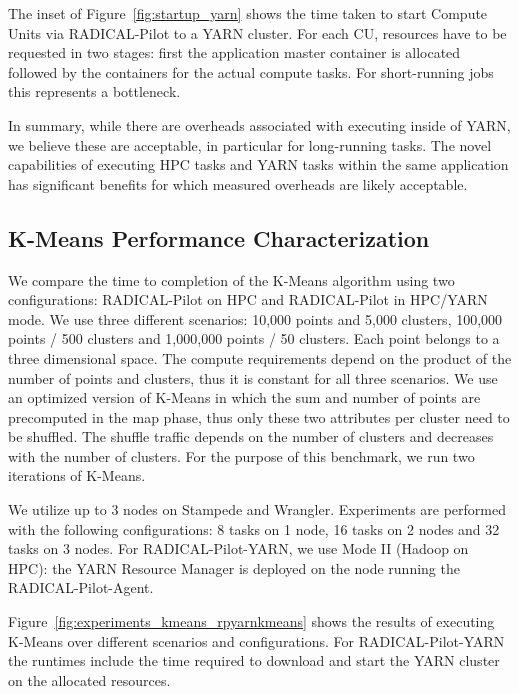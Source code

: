 The inset of Figure~\ref{fig:startup_yarn} shows the time taken to start Compute Units via RADICAL-Pilot to a YARN cluster.
For each CU, resources have to be requested in two stages: first the application master container is allocated followed by the containers for the actual compute tasks.
For short-running jobs this represents a bottleneck.

In summary, while there are overheads associated with executing inside of YARN, we believe these are acceptable, in particular for long-running tasks.
The novel capabilities of executing HPC tasks and YARN tasks within the same application has significant benefits for which measured overheads are likely acceptable.

\subsection{K-Means Performance Characterization}
\label{ssec:kmeans}
We compare the time to completion of the K-Means algorithm using two configurations: RADICAL-Pilot on HPC and RADICAL-Pilot in HPC/YARN mode. 
We use three different scenarios: 10,000 points and 5,000 clusters, 100,000 points / 500 clusters and 1,000,000 points / 50 clusters.
Each point belongs to a three dimensional space.
The compute requirements depend on the product of the number of points and clusters, thus it is constant for all three scenarios.
We use an optimized version of K-Means in which the sum and number of points are precomputed in the map phase, thus only these two attributes per cluster need to be shuffled.
The shuffle traffic depends on the number of clusters and decreases with the number of clusters.
For the purpose of this benchmark, we run two iterations of K-Means.

We utilize up to 3 nodes on Stampede and Wrangler.
Experiments are performed with the following configurations: 8 tasks on 1 node, 16 tasks on 2 nodes and 32 tasks on 3 nodes.
For RADICAL-Pilot-YARN, we use Mode II (Hadoop on HPC): the YARN Resource Manager is deployed on the node running the RADICAL-Pilot-Agent.

Figure~\ref{fig:experiments_kmeans_rpyarnkmeans} shows the results of executing K-Means over different scenarios and configurations.
For RADICAL-Pilot-YARN the runtimes include the time required to download and start the YARN cluster on the allocated resources.

